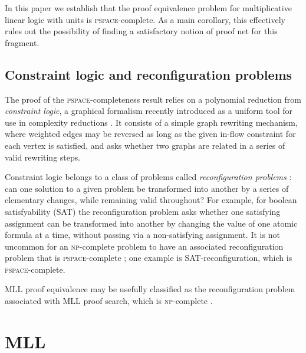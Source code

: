 \documentclass[conference,onecolumn]{IEEEtran}
\begin{document}
In this paper we establish that the proof equivalence problem for multiplicative linear logic with units is \textsc{pspace}-complete.
%
As a main corollary, this effectively rules out the possibility of finding a satisfactory notion of proof net for this fragment.



\subsection*{Constraint logic and reconfiguration problems}

The proof of the \textsc{pspace}-completeness result relies on a polynomial reduction from %
\emph{constraint logic}, a graphical formalism recently introduced as a uniform tool for use in complexity reductions \cite{Demaine-Hearn-2008}.
%
It consists of a simple graph rewriting mechanism, where weighted edges may be reversed as long as the given in-flow constraint for each vertex is satisfied, and asks whether two graphs are related in a series of valid rewriting steps.



Constraint logic belongs to a class of problems called \emph{reconfiguration problems} \cite{ReconfigurationProblems}: can one solution to a given problem be transformed into another by a series of elementary changes, while remaining valid throughout?
%
For example, for boolean satisfyability (SAT) the reconfiguration problem asks whether one satisfying assignment can be transformed into another by changing the value of one atomic formula at a time, without passing via a non-satisfying assignment.
%
It is not uncommon for an \textsc{np}-complete problem to have an associated reconfiguration problem that is \textsc{pspace}-complete \cite{ReconfigurationProblems}; one example is SAT-reconfiguration, which is \textsc{pspace}-complete.



MLL proof equivalence may be usefully classified as the reconfiguration problem associated with MLL proof search, which is \textsc{np}-complete \cite{Kanovich-1992}.





\section{MLL}
\end{document}
